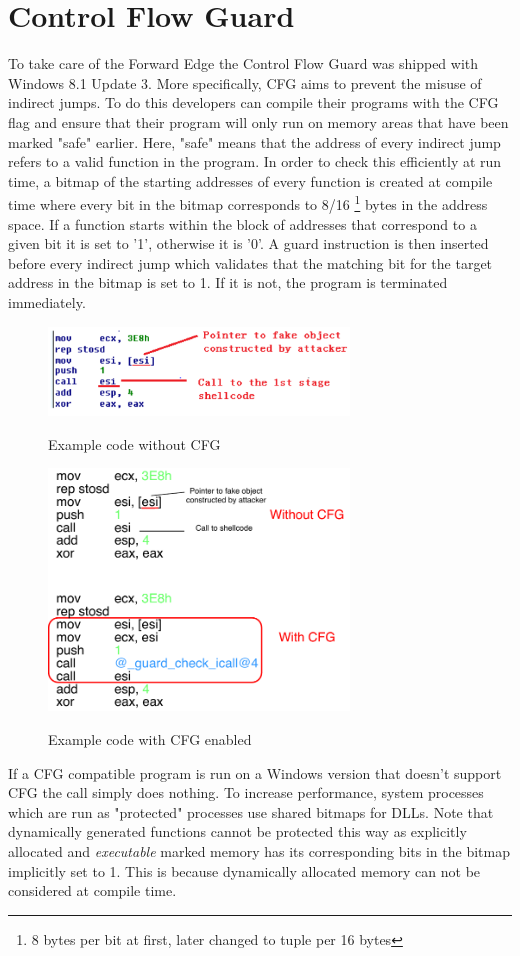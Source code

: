 \documentclass[10pt,twocolumn,a4paper]{article}
\begin{document}
\section{Control Flow Guard}\label{CFG}
To take care of the Forward Edge the Control Flow Guard was shipped with Windows 8.1 Update 3.
More specifically, CFG aims to prevent the misuse of indirect jumps.
To do this developers can compile their programs with the CFG flag and ensure that their program will only run on memory areas that have been marked "safe" earlier.
Here, "safe" means that the address of every indirect jump refers to a valid function in the program.
In order to check this efficiently at run time, a bitmap of the starting addresses of every function is created at compile time where every bit in the bitmap corresponds to 8/16 \footnote{8 bytes per bit at first, later changed to tuple per 16 bytes} bytes in the address space.
If a function starts within the block of addresses that correspond to a given bit it is set to '1', otherwise it is '0'.
A guard instruction is then inserted before every indirect jump which validates that the matching bit for the target address in the bitmap is set to 1. If it is not, the program is terminated immediately.
\begin{figure}[htbp]
	\includegraphics[keepaspectratio,width=8cm]{fig/nocfg}
	\caption{Example code without CFG\cite{cfgexplore}}
	\includegraphics[keepaspectratio,width=8cm]{fig/cfg}
	\caption{Example code with CFG enabled}\cite{cfgexplore}
\end{figure}
If a CFG compatible program is run on a Windows version that doesn't support CFG the call simply does nothing.
To increase performance, system processes which are run as "protected" processes use shared bitmaps for DLLs.
Note that dynamically generated functions cannot be protected this way as explicitly allocated and \emph{executable} marked memory has its corresponding bits in the bitmap implicitly set to 1.
This is because dynamically allocated memory can not be considered at compile time.
\end{document}
